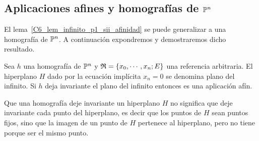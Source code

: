 \subsection{Aplicaciones afines y homografías de $\mathbb{P}^n$}
El lema~\ref{C6_lem_infinito_p1_sii_afinidad} se puede generalizar a una homografía de $\mathbb{P}^n$. A continuación expondremos y demostraremos dicho resultado.

\begin{prop}
	Sea $h$ una homografía de $\mathbb{P}^n$ y $\mathfrak{R}=\{x_0,\cdots,x_n;E\}$ una referencia arbitraria. El hiperplano $H$ dado por la ecuación implícita $x_n=0$ se denomina plano del infinito. Si $h$ deja invariante el plano del infinito entonces es una aplicación afín.
\end{prop}
\begin{obs}
	Que una homografía deje invariante un hiperplano $H$ no significa que deje invariante cada punto del hiperplano, es decir que los puntos de $H$ sean puntos fijos, sino que la imagen de un punto de $H$ pertenece al hiperplano, pero no tiene porque ser el mismo punto.
\end{obs}
